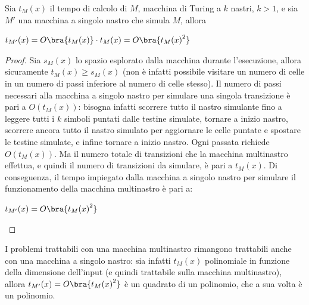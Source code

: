 \begin{thm}
    Sia $t_M (x)$ il tempo di calcolo di $M$, macchina di Turing a $k$ nastri,
    $k>1$, e sia $M'$ una macchina a singolo nastro che simula $M$, allora
    \begin{center}
        $t_{M'}(x) = O \bra{t_M(x)} \cdot t_M(x) = O \bra{{t_M (x)}^2}$
    \end{center}
\end{thm}

\begin{proof}
    Sia $s_M (x)$ lo spazio esplorato dalla macchina durante l'esecuzione,
    allora sicuramente $t_M (x) \ge s_M (x)$ (non è infatti possibile visitare
    un numero di celle in un numero di passi inferiore al numero di
    celle stesso).
    Il numero di passi necessari alla macchina a singolo nastro per simulare
    una singola transizione è pari a $O(t_M (x))$: bisogna infatti scorrere
    tutto il nastro simulante fino a leggere tutti i $k$ simboli puntati
    dalle testine simulate, tornare a inizio nastro, scorrere ancora tutto
    il nastro simulato per aggiornare le celle puntate e spostare le testine
    simulate, e infine tornare a inizio nastro.
    Ogni passata richiede $O(t_M(x))$.
    Ma il numero totale di transizioni che la macchina multinastro effettua,
    e quindi il numero di transizioni da simulare, è pari a $t_M(x)$.
    Di conseguenza, il tempo impiegato dalla macchina a singolo nastro per
    simulare il funzionamento della macchina multinastro è pari a:
    \begin{center}
        $t_{M'}(x) = O \bra{{t_M(x)}^2}$
    \end{center}
\end{proof}

\begin{rem}
    I problemi trattabili con una macchina multinastro rimangono trattabili
    anche con una macchina a singolo nastro: sia infatti $t_M(x)$ polinomiale
    in funzione della dimensione dell'input (e quindi trattabile sulla
    macchina multinastro), allora $t_{M'}(x) = O \bra{{t_M(x)}^2}$ è un
    quadrato di un polinomio, che a sua volta è un polinomio.
\end{rem}

